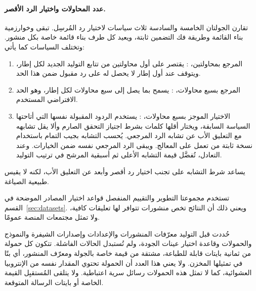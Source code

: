 \paragraph{عدد المحاولات واختيار الرد الأقصر.}
تقارن الجولتان الخامسة والسادسة ثلاث سياسات لاختيار رد المُرسِل. تبقى  وخوارزمية بناء القائمة وطريقة فك التضمين ثابتة، ويعيد كل طرف بناء قائمة خاصة بكل منشور. وتختلف السياسات كما يأتي:
\begin{enumerate}
\item المرجع بمحاولتين، : يقتصر على أول محاولتين من تتابع التوليد الجديد لكل إطار، ويتوقف عند أول إطار لا يحصل له على رد مقبول ضمن هذا الحد.
\item المرجع بسبع محاولات، : يسمح بما يصل إلى سبع محاولات لكل إطار، وهو الحد الافتراضي المستخدم.
\item الاختيار الموجز بسبع محاولات، : يستخدم الردود المقبولة نفسها التي أتاحتها السياسة السابقة، ويختار أقلها كلمات بشرط اجتياز التحقق الصارم وألا يقل تشابهه مع التعليق الأب عن تشابه الرد المرجعي. يُحسب التشابه بجيب التمام باستخدام نسخة ثابتة من  تعمل على المعالج. ويبقى الرد المرجعي نفسه ضمن الخيارات. وعند التعادل، تُفضَّل قيمة التشابه الأعلى ثم أسبقية المرشح في ترتيب التوليد.
\end{enumerate}
يساعد شرط التشابه على تجنب اختيار رد أقصر وأبعد عن التعليق الأب، لكنه لا يقيس طبيعية الصياغة.

تستخدم مجموعتا التطوير والتقييم المنفصل قواعد اختيار المصادر الموضحة في القسم~\ref{sec:datasets}. ويعني ذلك أن النتائج تخص منشورات تتوافر لها تعليقات كافية، ولا تمثل مجتمعات المنصة عمومًا.

حُددت قبل التوليد معرّفات المنشورات والإعدادات وإصدارات الشيفرة والنموذج والحمولات وقاعدة اختيار عينات الجودة، ولم تُستبدل الحالات الفاشلة. تتكون كل حمولة من ثمانية بايتات  قابلة للطباعة، مشتقة من قيمة خاصة بالجولة ومعرّف المنشور، أي \NUM{\FreshStorageBits} بتًا في تمثيلها المخزن. ولا يعني هذا العدد أن الحمولة تحتوي المقدار نفسه من الإنتروبيا العشوائية، كما لا تمثل هذه الحمولات رسائل سرية اعتباطية. ولا يتلقى المُستقبِل القيمة الخاصة أو بايتات الرسالة المتوقعة.


